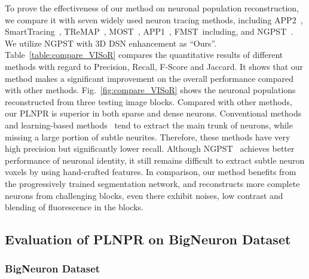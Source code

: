 To prove the effectiveness of our method on neuronal population reconstruction, we compare it with seven widely used neuron tracing methods, including APP2~\cite{Xiao2013}, SmartTracing~\cite{Chen2015}, TReMAP~\cite{Zhou2016}, MOST~\cite{Wu2014}, APP1~\cite{Peng2011}, FMST~\cite{Yang2018}including, and NGPST~\cite{Quan2015}.
%
We utilize NGPST with 3D DSN enhancement as ``Ours''. 
%
Table~\ref{table:compare_VISoR} compares the quantitative results of different methods with regard to Precision, Recall, F-Score and Jaccard.
%
It shows that our method makes a significant improvement on the overall performance compared with other methods.
%
Fig.~\ref{fig:compare_VISoR} shows the neuronal populations reconstructed from three testing image blocks.
%
Compared with other methods, our PLNPR is superior in both sparse and dense neurons.
Conventional methods~\cite{Xiao2013, Peng2011, Wu2014, Zhou2016} and learning-based methods~\cite{Chen2015, Yang2018} tend to extract the main trunk of neurons, while missing a large portion of subtle neurites. 
Therefore, these methods have very high precision but significantly lower recall.
Although NGPST~\cite{Quan2015} achieves better performance of neuronal identity, it still remains difficult to extract subtle neuron voxels by using hand-crafted features.
%
In comparison, our method benefits from the progressively trained segmentation network, and reconstructs more complete neurons from challenging blocks, even there exhibit noises, low contrast and blending of fluorescence in the blocks.


\subsection{Evaluation of PLNPR on BigNeuron Dataset}
\label{sec:exp_PLNPR_BigNeuron}

\subsubsection{BigNeuron Dataset}

